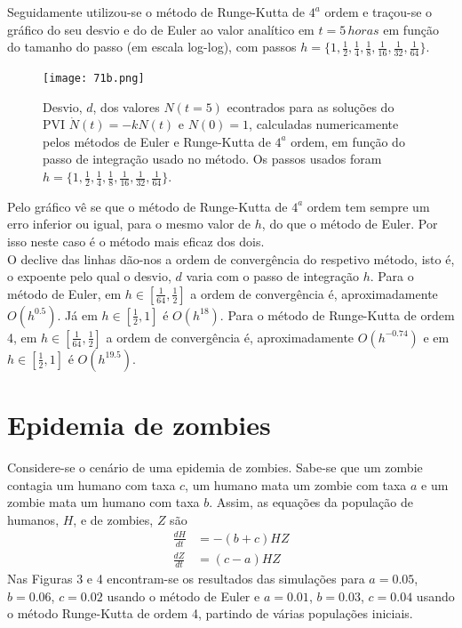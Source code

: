 \documentclass[aps,pre,twocolumn,showpacs,amsmath,amssymb]{revtex4-1}
\begin{document}
Seguidamente utilizou-se o método de Runge-Kutta de $4^{a}$ ordem e traçou-se o gráfico do seu desvio e do de Euler ao valor analítico em $t=5\, horas$ em função do tamanho do passo (em escala log-log), com passos $h=\{1,\frac{1}{2},\frac{1}{4},\frac{1}{8},\frac{1}{16},\frac{1}{32},\frac{1}{64}\}$.

\begin{figure}[h]
   \begin{center}
    \texttt{[image: 71b.png]} \\
\caption{Desvio, $d$, dos valores $N(t=5)$ econtrados para as soluções do PVI $\dot{N}(t)=-kN(t)$ e $N(0)=1$, calculadas numericamente pelos métodos de Euler e Runge-Kutta de $4^{a}$ ordem, em função do passo de integração usado no método. Os passos usados foram $h=\{1,\frac{1}{2},\frac{1}{4},\frac{1}{8},\frac{1}{16},\frac{1}{32},\frac{1}{64}\}$.}
  \label{fig.exemplo}
   \end{center}
  \end{figure}

Pelo gráfico vê se que o método de Runge-Kutta de $4^{a}$ ordem tem sempre um erro inferior ou igual, para o mesmo valor de $h$, do que o método de Euler. Por isso neste caso é o método mais eficaz dos dois.\\
O declive das linhas dão-nos a ordem de convergência do respetivo método, isto é, o expoente pelo qual o desvio, $d$ varia com o passo de integração $h$. Para o método de Euler, em $h\in [\frac{1}{64},\frac{1}{2}]$ a ordem de convergência é, aproximadamente $O(h^{0.5})$. Já em $h\in [\frac{1}{2},1]$ é $O(h^{18})$. Para o método de Runge-Kutta de ordem 4, em $h\in [\frac{1}{64},\frac{1}{2}]$ a ordem de convergência é, aproximadamente $O(h^{-0.74})$ e em $h\in [\frac{1}{2},1]$ é $O(h^{19.5})$.

\section{Epidemia de zombies}
Considere-se o cenário de uma epidemia de zombies. Sabe-se que um zombie contagia um humano com taxa $c$, um humano mata um zombie com taxa $a$ e um zombie mata um humano com taxa $b$. Assim, as equações da população de humanos, $H$, e de zombies, $Z$ são
\begin{equation}
\begin{split}
    \frac{dH}{dt} &= -(b+c)HZ \\
    \frac{dZ}{dt} &= (c-a)HZ
\end{split}
\end{equation}
Nas Figuras 3 e 4 encontram-se os resultados das simulações para $a=0.05$, $b=0.06$, $c=0.02$ usando o método de Euler e $a=0.01$, $b=0.03$, $c=0.04$ usando o método Runge-Kutta de ordem 4, partindo de várias populações iniciais.
\end{document}
